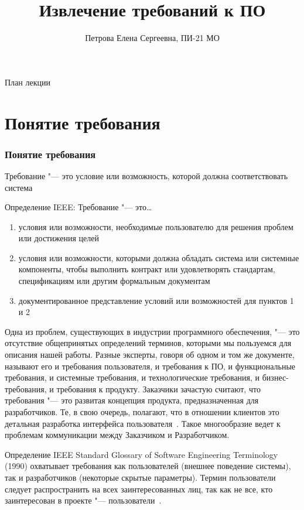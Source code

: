 \documentclass{../industrial-development}
\title{Извлечение требований к ПО}
\author{Петрова Елена Сергеевна, ПИ-21 МО}
\date{}
\begin{document}
\begin{frame}
  \titlepage
\end{frame}

\begin{frame}{План лекции}
  \tableofcontents
\end{frame}

\section{Понятие требования}
\begin{frame} \frametitle{Понятие требования}
  \begin{block}{}
   \alert{Требование} "--- это условие или возможность, которой должна соответствовать система
  \end{block}
  Определение IEEE:  \alert{Требование} "--- это\dots
	 \begin{enumerate}
\item условия или возможности, необходимые пользователю для решения проблем или достижения целей
\item условия или возможности, которыми должна обладать система или системные компоненты, чтобы выполнить контракт или
удовлетворять стандартам, спецификациям или другим формальным документам
\item документированное представление условий или возможностей для пунктов 1 и 2
  \end{enumerate}
\end{frame}

\lecturenotes

Одна из проблем, существующих в индустрии программного обеспечения, "--- это отсутствие общепринятых определений терминов, которыми мы пользуемся для описания нашей работы. Разные эксперты, говоря об одном и том же документе, называют его и требования пользователя, и требования к ПО, и функциональные требования, и системные требования, и технологические требования, и бизнес-требования, и требования к продукту. Заказчики зачастую считают, что требования "--- это развитая концепция продукта, предназначенная для разработчиков. Те, в свою очередь, полагают, что в отношении клиентов это детальная разработка интерфейса пользователя~\cite[с.~6]{Wiegers}. Такое многообразие ведет к проблемам коммуникации между Заказчиком и Разработчиком.

Определение IEEE Standard Glossary
of Software Engineering Terminology (1990) охватывает требования как пользователей (внешнее поведение системы), так и разработчиков (некоторые скрытые параметры). Термин пользователи следует распространить на всех заинтересованных лиц, так как не все, кто заинтересован в проекте "--- пользователи~\cite[с.~7]{Wiegers}. 
\end{document}
